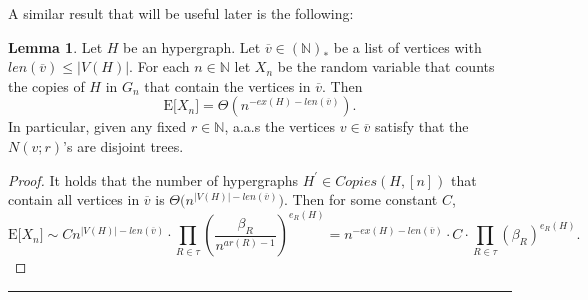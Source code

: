 \documentclass[12pt,notitlepage,a4paper]{article}
\theoremstyle{definition}
\newtheorem{lemma}{Lemma}[section]
\newcommand{\N}{\mathbb{N}}
\newcommand{\sep}{\noindent\rule{2cm}{0.4pt}}
\begin{document}
A similar result that will be useful later is the following:

%
%

\begin{lemma}\label{lem:nocopiesfixed}
	Let $H$ be an hypergraph. Let
	$\overline{v}\in (\N)_*$ be a list of vertices
	with $len(\overline{v})\leq |V(H)|$.
	For each $n\in \N$ 
	let $X_n$ be the random variable that
	counts the copies of $H$ in $G_n$ that contain the vertices
	in $\overline{v}$. Then
	\[
	\mathrm{E}\big[ X_n \big]=\Theta(n^{-ex(H)-len(\overline{v})}).\]
	In particular, given any fixed $r\in \N$,
	a.a.s the vertices $v\in \overline{v}$ satisfy that
	the $N(v;r)$'s are disjoint trees.	
\end{lemma}
\begin{proof}
	It holds that the number of hypergraphs $H^\prime \in Copies(H,[n])$
	that contain all vertices in $\overline{v}$ is
	 $\Theta\big(n^{|V(H)|-len(\overline{v})}\big)$. Then for
	 some constant $C$,
	\[
	\mathrm{E}\big[ X_n \big]\sim 
	C n^{|V(H)|-len(\overline{v})}
	\cdot\prod_{R\in\tau} \left( \frac{\beta_R}{n^{ar(R)-1}}\right)^{e_R(H)}=
	n^{-ex(H)-len(\overline{v})}\cdot C \cdot
	\prod_{R\in\tau} \left( \beta_R \right)^{e_R(H)}.
	\]
\end{proof}
\sep
\end{document}
